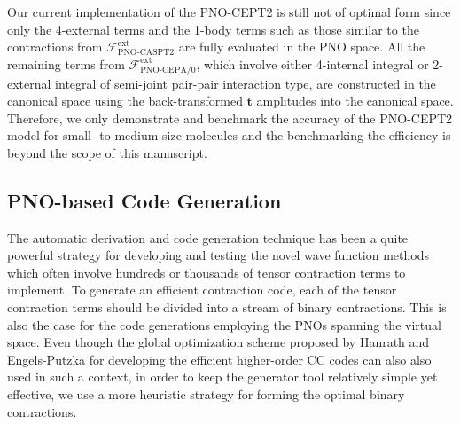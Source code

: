 \documentclass[aip,jcp,amsmath]{revtex4-1}
\begin{document}
%
Our current implementation of the PNO-CEPT2 is still not of optimal form since only the 4-external terms and the 1-body terms such as those similar to the contractions from $\mathscr{F}_\text{PNO-CASPT2}^\text{ext}$ are fully evaluated in the PNO space.
%
All the remaining terms from $\mathscr{F}_\text{PNO-CEPA/0}^\text{ext}$, which involve either 4-internal integral or 2-external integral of semi-joint pair-pair interaction type,\cite{neeseefficient2009cepa,neeseefficient2009} are constructed in the canonical space using the back-transformed $\mathbf{t}$ amplitudes into the canonical space.
%
Therefore, we only demonstrate and benchmark the accuracy of the PNO-CEPT2 model for small- to medium-size molecules and the benchmarking the efficiency is beyond the scope of this manuscript.

\subsection{PNO-based Code Generation}
%
The automatic derivation and code generation technique has been a quite powerful strategy for developing and testing the novel wave function methods which often involve hundreds or thousands of tensor contraction terms to implement.\cite{CJanssen1991,doi:10.1021/jp034596z,SHirataTCE2004,SHirataTCE2006,doi:10.1080/00268970500275780,KoehnJCP2009_1,KoehnJCP2009_2,MHandKoehn2009,MHandKoehn2011,AK74,AK77,ShiozakiJCP2008,ShiozakiPCCP2008,ShiozakiJCP2009_1,ShiozakiJCP2009_2,doi:10.1063/1.4907717,doi:10.1063/1.4959029,doi:10.1002/jcc.24833,doi:10.1063/1.5001320,doi:10.1063/1.5048688,dattaa2011,doi:10.1063/1.3089302,doi:10.1063/1.3664729,PCMRCI2011}
%
To generate an efficient contraction code, each of the tensor contraction terms should be divided into a stream of binary contractions.
%
This is also the case for the code generations employing the PNOs spanning the virtual space.
%
Even though the global optimization scheme proposed by Hanrath and Engels-Putzka for developing the efficient higher-order CC codes\cite{hanrathan2010,engels-putzkaa2011} can also also used in such a context, in order to keep the generator tool relatively simple yet effective, we use a more heuristic strategy for forming the optimal binary contractions.
\end{document}
